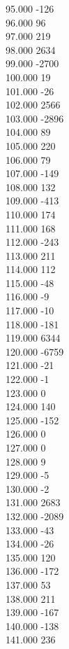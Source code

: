 { 95.000	-126 \\
 96.000	96 \\
 97.000	219 \\
 98.000	2634 \\
 99.000	-2700 \\
 100.000	19 \\
 101.000	-26 \\
 102.000	2566 \\
 103.000	-2896 \\
 104.000	89 \\
 105.000	220 \\
 106.000	79 \\
 107.000	-149 \\
 108.000	132 \\
 109.000	-413 \\
 110.000	174 \\
 111.000	168 \\
 112.000	-243 \\
 113.000	211 \\
 114.000	112 \\
 115.000	-48 \\
 116.000	-9 \\
 117.000	-10 \\
 118.000	-181 \\
 119.000	6344 \\
 120.000	-6759 \\
 121.000	-21 \\
 122.000	-1 \\
 123.000	0 \\
 124.000	140 \\
 125.000	-152 \\
 126.000	0 \\
 127.000	0 \\
 128.000	9 \\
 129.000	-5 \\
 130.000	-2 \\
 131.000	2683 \\
 132.000	-2089 \\
 133.000	-43 \\
 134.000	-26 \\
 135.000	120 \\
 136.000	-172 \\
 137.000	53 \\
 138.000	211 \\
 139.000	-167 \\
 140.000	-138 \\
 141.000	236 \\
}
